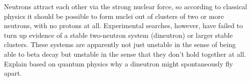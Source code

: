 \begin{dq}
Neutrons attract each other via the strong nuclear force,
so according to classical physics it should be possible to
form nuclei out of clusters of two or more neutrons, with no
protons at all. Experimental searches, however, have failed
to turn up evidence of a stable two-neutron system
(dineutron) or larger stable clusters. These systems are apparently
not just unstable in the sense of being able to beta decay but
unstable in the sense that they don't hold together at all.
Explain based on
quantum physics why a dineutron might spontaneously fly apart.
\end{dq}

